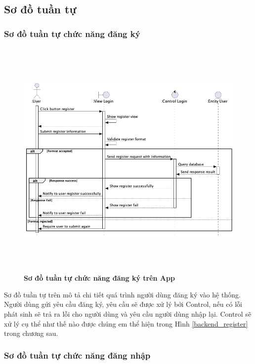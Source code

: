 \subsection{Sơ đồ tuần tự}

\subsubsection{Sơ đồ tuần tự chức năng đăng ký}
\mbox{}
  \begin{figure}[H]
        \centering
        \includegraphics[width=16cm,height=12cm]{Images/mobile_app/register.png}
        \caption[Sơ đồ tuần tự chức năng đăng ký trên App]{\bfseries \fontsize{12pt}{0pt}
        \selectfont Sơ đồ tuần tự chức năng đăng ký trên App}
        \label{register} %
  \end{figure}
  Sơ đồ tuần tự trên mô tả chi tiết quá trình người dùng đăng ký vào hệ thống. Người dùng gửi yêu cầu đăng ký, yêu cầu sẽ
  được xử lý bởi Control, nếu có lỗi phát sinh sẽ trả ra lỗi cho người dùng và yêu cầu người dùng nhập lại. Control
  sẽ xử lý cụ thể như thế nào được chúng em thể hiện trong Hình \ref{backend_register} trong chương sau.
\subsubsection{Sơ đồ tuần tự chức năng đăng nhập}
\mbox{}


